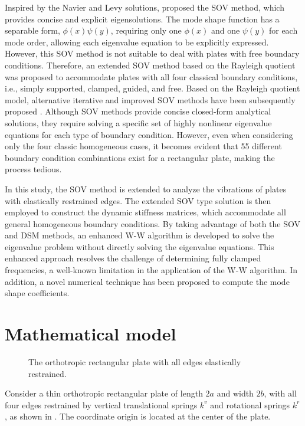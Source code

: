 \documentclass[preprint,12pt]{elsarticle}
\begin{document}
Inspired by the Navier and Levy solutions, \citet{xing2009new} proposed the SOV method, which provides concise and explicit eigensolutions.
The mode shape function has a separable form, $\phi(x) \psi(y)$, requiring only one $\phi(x)$ and one $\psi(y)$ for each mode order, allowing each eigenvalue equation to be explicitly expressed.
However, this SOV method is not suitable to deal with plates with free boundary conditions.
Therefore, an extended SOV method \cite{xing2018overall, xing2020extended} based on the Rayleigh quotient was proposed to accommodate plates with all four classical boundary conditions, i.e., simply supported, clamped, guided, and free.
Based on the Rayleigh quotient model, alternative iterative and improved SOV methods have been subsequently proposed \cite{xing2020improved}.
Although SOV methods provide concise closed-form analytical solutions, they require solving a specific set of highly nonlinear eigenvalue equations for each type of boundary condition.
However, even when considering only the four classic homogeneous cases, it becomes evident that 55 different boundary condition combinations exist for a rectangular plate, making the process tedious.

In this study, the SOV method is extended to analyze the vibrations of plates with elastically restrained edges.
The extended SOV type solution is then employed to construct the dynamic stiffness matrices, which accommodate all general homogeneous boundary conditions.
By taking advantage of both the SOV and DSM methods, an enhanced W-W algorithm is developed to solve the eigenvalue problem without directly solving the eigenvalue equations.
This enhanced approach resolves the challenge of determining fully clamped frequencies, a well-known limitation in the application of the  W-W algorithm.
In addition, a novel numerical technique has been proposed to compute the mode shape coefficients.


\FloatBarrier
\section{Mathematical model}\label{sec:Mathematical model}
\begin{figure}[!htbp]
	\centering
	\resizebox{0.8\textwidth}{!}
	{
		
	}
	\caption{\small The orthotropic rectangular plate with all edges elastically restrained.} 
	\label{fig:platemode}
\end{figure}
Consider a thin orthotropic rectangular plate of length $2a$ and width $2b$, with all four edges restrained by vertical translational springs $k^v$ and rotational springs $k^r$, as shown in . 
The coordinate origin is located at the center of the plate.
\end{document}
